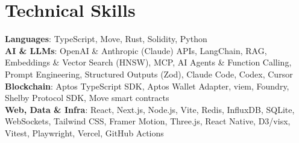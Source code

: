 \documentclass[letterpaper,9pt]{extarticle}
\begin{document}
\section{Technical Skills}
 \begin{itemize}[leftmargin=0.15in, label={}]
    \small{\item{
     \textbf{Languages}{: TypeScript, Move, Rust, Solidity, Python} \\
     \textbf{AI \& LLMs}{: OpenAI \& Anthropic (Claude) APIs, LangChain, RAG, Embeddings \& Vector Search (HNSW), MCP, AI Agents \& Function Calling, Prompt Engineering, Structured Outputs (Zod), Claude Code, Codex, Cursor} \\
     \textbf{Blockchain}{: Aptos TypeScript SDK, Aptos Wallet Adapter, viem, Foundry, Shelby Protocol SDK, Move smart contracts} \\
     \textbf{Web, Data \& Infra}{: React, Next.js, Node.js, Vite, Redis, InfluxDB, SQLite, WebSockets, Tailwind CSS, Framer Motion, Three.js, React Native, D3/visx, Vitest, Playwright, Vercel, GitHub Actions}
    }}
 \end{itemize}
\end{document}
